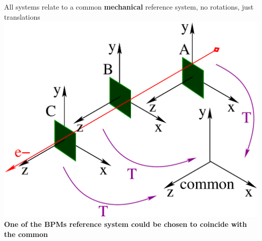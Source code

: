 \documentclass[a4paper,11pt]{book}
\begin{document}
\centering
{\tiny All systems relate to a common \textbf{mechanical} reference system, no rotations, just translations}\\
\includegraphics[scale=0.2,angle=0]{fig17.pdf}\\\centering
{\tiny \textbf{One of the BPMs reference system could be chosen to coincide with the common}\\
}
\end{document}

